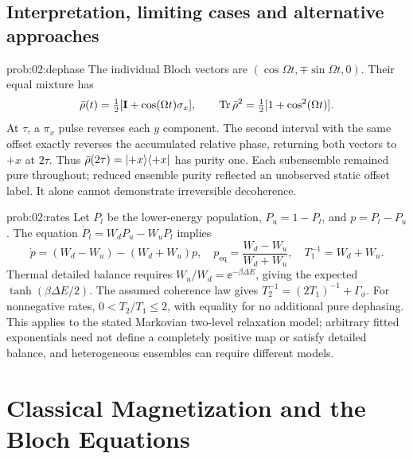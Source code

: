 \subsection{Interpretation, limiting cases and alternative approaches}
\begin{solution}{prob:02:dephase}
The individual Bloch vectors are
\((\cos\Omega t,\mp\sin\Omega t,0)\). Their equal mixture has
\[
 \bar\rho(t)=\tfrac12[\mathbf{I}+\cos(\Omega t)\sigma_x],
 \qquad \operatorname{Tr}\bar\rho^2=\tfrac12[1+\cos^2(\Omega t)].
\]
At \(\tau\), a \(\pi_x\) pulse reverses each \(y\) component. The second interval with the same offset exactly reverses the accumulated relative phase, returning both vectors to \(+x\) at \(2\tau\). Thus \(\bar\rho(2\tau)=\lvert +x\rangle\langle +x\rvert\) has purity one. Each subensemble remained pure throughout; reduced ensemble purity reflected an unobserved static offset label. It alone cannot demonstrate irreversible decoherence.
\end{solution}
\begin{solution}{prob:02:rates}
Let \(P_l\) be the lower-energy population, \(P_u=1-P_l\), and \(p=P_l-P_u\).
The equation \(\dot P_l=W_dP_u-W_uP_l\) implies
\[
 \dot p=(W_d-W_u)-(W_d+W_u)p,\quad
 p_{\mathrm{eq}}=\frac{W_d-W_u}{W_d+W_u},\quad
 T_1^{-1}=W_d+W_u.
\]
Thermal detailed balance requires \(W_u/W_d=\ee^{-\beta\Delta E}\), giving the expected \(\tanh(\beta\Delta E/2)\).
The assumed coherence law gives
\(T_2^{-1}=(2T_1)^{-1}+\Gamma_\phi\).
For nonnegative rates, \(0<T_2/T_1\leq2\), with equality for no additional pure dephasing. This applies to the stated Markovian two-level relaxation model; arbitrary fitted exponentials need not define a completely positive map or satisfy detailed balance, and heterogeneous ensembles can require different models.
\end{solution}

\section{Classical Magnetization and the Bloch Equations}
\label{sec:e:classical-magnetization-and-the-bloch-equations}
